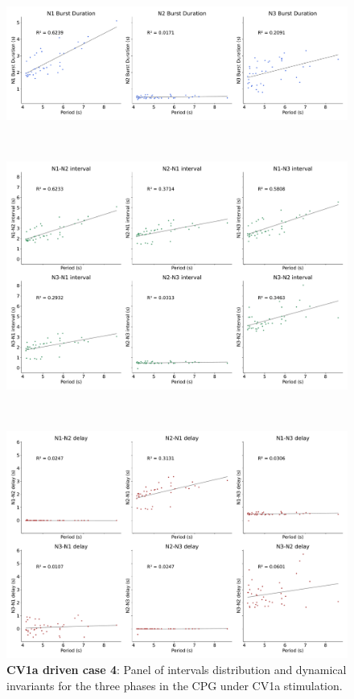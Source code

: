 \begin{figure}[htbp]
\begin{minipage}[b]{0.53\textwidth}
		\centering
		\begin{minipage}[b]{\textwidth}
			\centering
			\includegraphics[width=\textwidth]{./invariants/data/SUSSEX/CV1a_driven4/images/stim_cv1a4_3phases_durations.pdf}
		\end{minipage}\\
		\begin{minipage}[b]{\textwidth}
			\centering
			\includegraphics[width=\textwidth]{./invariants/data/SUSSEX/CV1a_driven4/images/stim_cv1a4_3phases_intervals.pdf}
		\end{minipage}\\
		\begin{minipage}[b]{\textwidth}
			\centering
			\includegraphics[width=\textwidth]{./invariants/data/SUSSEX/CV1a_driven4/images/stim_cv1a4_3phases_delays.pdf}
		\end{minipage}
	\end{minipage}
	\caption{\textbf{CV1a driven case 4}: Panel of intervals distribution and dynamical invariants for the three phases in the CPG under CV1a stimulation.}
	\label{fig:cv1a 4 3phases}
\end{figure}

